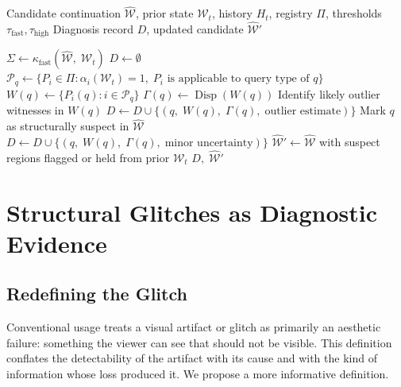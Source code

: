 \documentclass[11pt,a4paper]{article}
\theoremstyle{plain}
\theoremstyle{definition}
\theoremstyle{remark}
\DeclareMathOperator{\Disp}{Disp}
\begin{document}
\begin{algorithm}[h]
\caption{Witness-Based Structural Diagnosis}
\label{alg:witness}
\begin{algorithmic}[1]
\Require Candidate continuation $\hat{\mathcal{W}}$, prior state $\mathcal{W}_t$, history $H_t$, registry $\Pi$, thresholds $\tau_{\text{fast}}, \tau_{\text{high}}$
\Ensure Diagnosis record $D$, updated candidate $\hat{\mathcal{W}}'$

\State $\Sigma \gets \kappa_{\text{fast}}(\hat{\mathcal{W}},\; \mathcal{W}_t)$ 
\State $D \gets \emptyset$
    \State $\mathcal{P}_q \gets \{ P_i \in \Pi : \alpha_i(\mathcal{W}_t) = 1,\; P_i \text{ is applicable to query type of } q\}$
    \State $W(q) \gets \{ P_i(q) : i \in \mathcal{P}_q \}$
    \State $\Gamma(q) \gets \Disp(W(q))$
        \State Identify likely outlier witnesses in $W(q)$
        \State $D \gets D \cup \{(q,\; W(q),\; \Gamma(q),\; \text{outlier estimate})\}$
        \State Mark $q$ as structurally suspect in $\hat{\mathcal{W}}$
        \State $D \gets D \cup \{(q,\; W(q),\; \Gamma(q),\; \text{minor uncertainty})\}$
    \EndIf
\EndFor
\State $\hat{\mathcal{W}}' \gets \hat{\mathcal{W}}$ with suspect regions flagged or held from prior $\mathcal{W}_t$
\State \Return $D,\; \hat{\mathcal{W}}'$
\end{algorithmic}
\end{algorithm}

\section{Structural Glitches as Diagnostic Evidence}
\label{sec:glitches}

\subsection{Redefining the Glitch}

Conventional usage treats a visual artifact or glitch as primarily an aesthetic failure: something the viewer can see that should not be visible. This definition conflates the detectability of the artifact with its cause and with the kind of information whose loss produced it. We propose a more informative definition.
\end{document}
